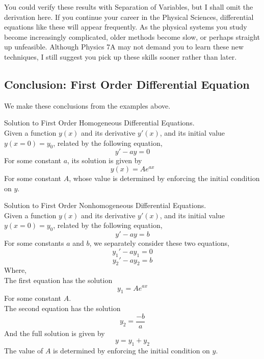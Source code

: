 \documentclass[11pt]{article}
\theoremstyle{gangnamstyle}{\newtheorem{definition}{Definition}[]}
\theoremstyle{gangnamstyle}{\newtheorem{example}{Example}[]}
\theoremstyle{gangnamstyle}{\newtheorem{problem}{Problem}[]}
\theoremstyle{gangnamstyle}{\newtheorem{warning}{Warning}[]}
\begin{document}
You could verify these results with Separation of Variables, but I shall omit the derivation here. If you continue your career in the Physical Sciences, differential equations like these will appear frequently. As the physical systems you study become increasingly complicated, older methods become slow, or perhaps straight up unfeasible. Although Physics 7A may not demand you to learn these new techniques, I still suggest you pick up these skills sooner rather than later. 

\subsection{Conclusion: First Order Differential Equation}

We make these conclusions from the examples above. 

\begin{definition}
Solution to First Order Homogeneous Differential Equations. \\
Given a function $y(x)$ and its derivative $y'(x)$, and its initial value $y(x = 0) = y_0$, related by the following equation, 
\begin{equation}
y' - ay = 0
\end{equation}
For some constant $a$, its solution is given by
\begin{equation}
y(x) = Ae^{ax}
\end{equation}
For some constant $A$, whose value is determined by enforcing the initial condition on $y$. 
\end{definition}

\begin{definition}
Solution to First Order Nonhomogeneous Differential Equations. \\
Given a function $y(x)$ and its derivative $y'(x)$, and its initial value $y(x = 0) = y_0$, related by the following equation, 
\begin{equation}
y' - ay = b
\end{equation}
For some constants $a$ and $b$, we separately consider these two equations, 
\begin{equation}
y_1' - ay_1 = 0
\end{equation}
\begin{equation}
y_2' - ay_2 = b
\end{equation}
Where, \\
The first equation has the solution
\begin{equation}
y_1 = Ae^{ax} 
\end{equation}
For some constant $A$. \\
The second equation has the solution
\begin{equation}
y_2 = \frac{-b}{a}
\end{equation}
And the full solution is given by 
\begin{equation}
y = y_1 + y_2
\end{equation}
The value of $A$ is determined by enforcing the initial condition on $y$. 
\end{definition}
\end{document}
